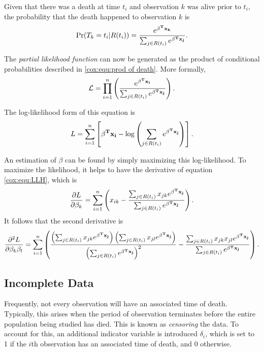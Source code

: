 Given that there was a death at time $t_i$ and observation $k$ was alive prior
to $t_i$, the probability that the death happened to observation $k$  is
\begin{equation}\label{cox:equ:death-prob}
\Pr(T_k = t_i | R(t_i)) =  \frac{e^{\bold{\beta^T x_k} }}{ \sum_{j \in R(t_i)} e^{\bold{\beta^T x_j}}}.
\end{equation}

The \textit{partial likelihood function} can now be generated as the product of
conditional probabilities described in \ref{cox:equ:prod of death}.  More
formally,
\begin{equation}\label{cox:equ:likelihood}
\mathcal{L} = \prod_{i = 1}^n \left(  \frac{e^{\bold{\beta^T x_i} }}{ \sum_{j \in R(t_i)} e^{\bold{\beta^T x_j}}} \right).
\end{equation}

 The log-likelihood form of this equation is
\begin{equation}\label{cox:equ:LLH}
L = \sum_{i = 1}^n \left[  \bold{\beta^T x_i} - \log\left(\sum_{j \in R(t_i)} e^{\bold{\beta^T x_j} } \right) \right].
\end{equation}

An estimation of $\beta$ can be found by simply maximizing this log-likelihood.
To maximize the likelihood, it helps to have the derivative of equation
\ref{cox:equ:LLH}, which is
\begin{equation}\label{cox:equ:LLH derivative}
\frac{\partial L}{\partial \beta_k} = \sum_{i = 1}^n \left( x_{ik} - \frac{\sum_{j \in R(t_i)} x_{jk} e^{\bold{\beta^T x_j} } }{\sum_{j \in R(t_i)} e^{\bold{\beta^T x_j} } } \right).
\end{equation}
It follows that the second derivative is
\begin{equation}\label{cox:equ:LLH second derivative}
\frac{\partial^2 L}{\partial \beta_k \beta_l} = \sum_{i = 1}^n
            \left(
                \frac{\left(  \sum_{j \in R(t_i)} x_{jk} e^{\bold{\beta^T x_j} } \right)
                            \left(  \sum_{j \in R(t_i)} x_{jl} e^{\bold{\beta^T x_j} } \right)}
                     {\left( \sum_{j \in R(t_i)} e^{\bold{\beta^T x_j} } \right)^2 } -
                \frac{  \sum_{j \in R(t_i)} x_{jk}x_{jl} e^{\bold{\beta^T x_j} } }
                     {\sum_{j \in R(t_i)} e^{\bold{\beta^T x_j} } }
            \right).
\end{equation}

\subsection{Incomplete Data}
Frequently, not every observation will have an associated time of death.
Typically, this arises when the period of observation terminates before the
entire population being studied has died.  This is known as \textit{censoring}
the data.  To account for this, an additional indicator variable is introduced
$\delta_i$, which is set to 1 if the $i$th observation has an associated time of
death, and 0 otherwise.

